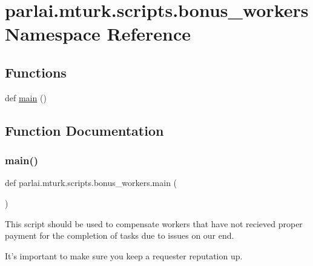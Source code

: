 \hypertarget{namespaceparlai_1_1mturk_1_1scripts_1_1bonus__workers}{}\section{parlai.\+mturk.\+scripts.\+bonus\+\_\+workers Namespace Reference}
\label{namespaceparlai_1_1mturk_1_1scripts_1_1bonus__workers}
\subsection*{Functions}
\begin{DoxyCompactItemize}
\item 
def \hyperlink{namespaceparlai_1_1mturk_1_1scripts_1_1bonus__workers_aafc7a350f4abb5524c1b7477b3fc2bda}{main} ()
\end{DoxyCompactItemize}


\subsection{Function Documentation}
\mbox{\label{namespaceparlai_1_1mturk_1_1scripts_1_1bonus__workers_aafc7a350f4abb5524c1b7477b3fc2bda}} 
\subsubsection{\texorpdfstring{main()}{main()}}
{\footnotesize\ttfamily def parlai.\+mturk.\+scripts.\+bonus\+\_\+workers.\+main (\begin{DoxyParamCaption}{ }\end{DoxyParamCaption})}

\begin{DoxyVerb}This script should be used to compensate workers that have not recieved proper
payment for the completion of tasks due to issues on our end.

It's important to make sure you keep a requester reputation up.
\end{DoxyVerb}
 